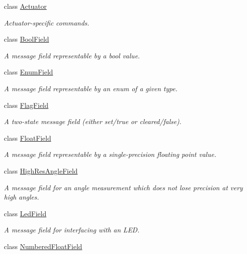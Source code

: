 \begin{DoxyCompactItemize}
\item 
class \hyperlink{classhebi_1_1Command_1_1Actuator}{Actuator}
\begin{DoxyCompactList}\small\item\em Actuator-\/specific commands. \end{DoxyCompactList}\item 
class \hyperlink{classhebi_1_1Command_1_1BoolField}{Bool\+Field}
\begin{DoxyCompactList}\small\item\em A message field representable by a bool value. \end{DoxyCompactList}\item 
class \hyperlink{classhebi_1_1Command_1_1EnumField}{Enum\+Field}
\begin{DoxyCompactList}\small\item\em A message field representable by an enum of a given type. \end{DoxyCompactList}\item 
class \hyperlink{classhebi_1_1Command_1_1FlagField}{Flag\+Field}
\begin{DoxyCompactList}\small\item\em A two-\/state message field (either set/true or cleared/false). \end{DoxyCompactList}\item 
class \hyperlink{classhebi_1_1Command_1_1FloatField}{Float\+Field}
\begin{DoxyCompactList}\small\item\em A message field representable by a single-\/precision floating point value. \end{DoxyCompactList}\item 
class \hyperlink{classhebi_1_1Command_1_1HighResAngleField}{High\+Res\+Angle\+Field}
\begin{DoxyCompactList}\small\item\em A message field for an angle measurement which does not lose precision at very high angles. \end{DoxyCompactList}\item 
class \hyperlink{classhebi_1_1Command_1_1LedField}{Led\+Field}
\begin{DoxyCompactList}\small\item\em A message field for interfacing with an L\+ED. \end{DoxyCompactList}\item 
class \hyperlink{classhebi_1_1Command_1_1NumberedFloatField}{Numbered\+Float\+Field}

\end{DoxyCompactItemize}
